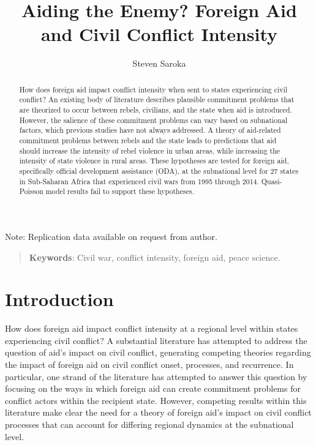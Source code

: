 \documentclass[12pt, letterpaper]{article}
\title{Aiding the Enemy? Foreign Aid and Civil Conflict Intensity}
\author{Steven Saroka}
\begin{document}
 
	\maketitle
	\doublespacing
	\vspace{5.5in}
	\noindent Note: Replication data available on request from author.
	\thispagestyle{empty}
	\newpage
	\thispagestyle{empty}
	\begin{abstract}
		\begin{normalsize}
	How does foreign aid impact conflict intensity when sent to states experiencing civil conflict? An existing body of literature describes plausible commitment problems that are theorized to occur between rebels, civilians, and the state when aid is introduced. However, the salience of these commitment problems can vary based on subnational factors, which previous studies have not always addressed. A theory of aid-related commitment problems between rebels and the state leads to predictions that aid should increase the intensity of rebel violence in urban areas, while increasing the intensity of state violence in rural areas. These hypotheses are tested for foreign aid, specifically official development assistance (ODA), at the subnational level for 27 states in Sub-Saharan Africa that experienced civil wars from 1995 through 2014. Quasi-Poisson model results fail to support these hypotheses. 
			
		\end{normalsize}
	\end{abstract}
	
	\begin{quote}
		\textbf{Keywords}: Civil war, conflict intensity, foreign aid, peace science.
	\end{quote}
	\newpage
\section{Introduction}
	
How does foreign aid impact conflict intensity at a regional level within states experiencing civil conflict? A substantial literature has attempted to address the question of aid’s impact on civil conflict, generating competing theories regarding the impact of foreign aid on civil conflict onset, processes, and recurrence. In particular, one strand of the literature has attempted to answer this question by focusing on the ways in which foreign aid can create commitment problems for conflict actors within the recipient state. However, competing results within this literature make clear the need for a theory of foreign aid’s impact on civil conflict processes that can account for differing regional dynamics at the subnational level.
\end{document}
